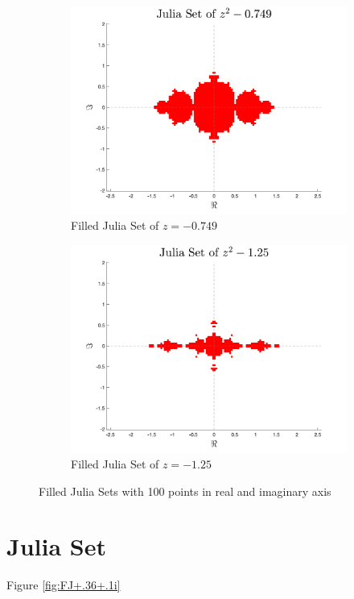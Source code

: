 \documentclass[letterpaper,11pt]{article}
\begin{document}
\begin{figure}
	\begin{subfigure}[b]{0.49\textwidth}
		\includegraphics[width=\textwidth]{../Figures/FilledJulia3.png}
		\caption{Filled Julia Set of $z = - 0.749$}
		\label{fig:-.749}
	\end{subfigure}
	\begin{subfigure}[b]{0.49\textwidth}
		\includegraphics[width=\textwidth]{../Figures/FilledJulia4.png}
		\caption{Filled Julia Set of $z = -1.25$}
		\label{fig:FJ-1.25}
	\end{subfigure}
	\caption{Filled Julia Sets with 100 points in real and imaginary axis}
	\label{fig:FJwithC}
\end{figure}

\section{Julia Set}
Figure \ref{fig:FJ+.36+.1i}
\end{document}
